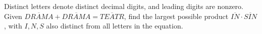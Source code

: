 Distinct letters denote distinct decimal digits, and leading digits are nonzero. Given $\overline{DRAMA}+\overline{DRAMA}=\overline{TEATR}$, find the largest possible product $\overline{IN}\cdot\overline{SIN}$, with $I,N,S$ also distinct from all letters in the equation.
